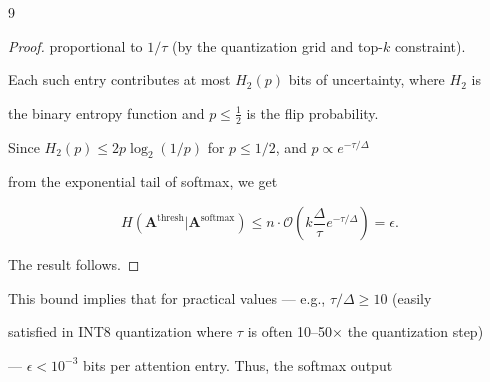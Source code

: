 \documentclass[11pt]{article}
\theoremstyle{definition}
\begin{document}
\begin{thebibliography}{9}
{{{\begin{proof}
proportional to $1/\tau$ (by the quantization grid and top-$k$ constraint).






Each such entry contributes at most $H_2(p)$ bits of uncertainty, where $H_2$ is






the binary entropy function and $p \leq \frac{1}{2}$ is the flip probability.






Since $H_2(p) \leq 2p\log_2(1/p)$ for $p \leq 1/2$, and $p \propto e^{-\tau/\Delta}$






from the exponential tail of softmax, we get






$$






H(\mathbf{A}^{\text{thresh}} | \mathbf{A}^{\text{softmax}}) \leq n \cdot \mathcal{O}\left(






k \frac{\Delta}{\tau} e^{-\tau / \Delta} \right) = \epsilon.






$$






The result follows.






\end{proof}













This bound implies that for practical values — e.g., $\tau / \Delta \geq 10$ (easily






satisfied in INT8 quantization where $\tau$ is often 10–50× the quantization step)






— $\epsilon < 10^{-3}$ bits per attention entry. Thus, the softmax output






}}}
\end{thebibliography}
\end{document}
